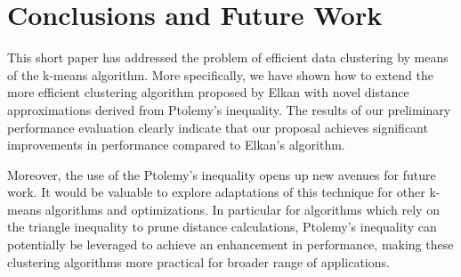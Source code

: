 




\section{Conclusions and Future Work} \label{sec: conclusions}

This short paper has addressed the problem of efficient data clustering by means of the k-means algorithm. More specifically, we have shown how to extend the more efficient clustering algorithm proposed by Elkan with novel distance approximations derived from Ptolemy's inequality. The results of our preliminary performance evaluation clearly indicate that our proposal achieves significant improvements in performance compared to Elkan's algorithm. %

Moreover, the use of the Ptolemy's inequality opens up new avenues for future work. It would be valuable to explore adaptations of this technique for other k-means algorithms and optimizations. In particular for algorithms which rely on the triangle inequality to prune distance calculations, Ptolemy's inequality can potentially be leveraged to achieve an enhancement in performance, making these clustering algorithms more practical for broader range of  applications. 

\pagebreak


